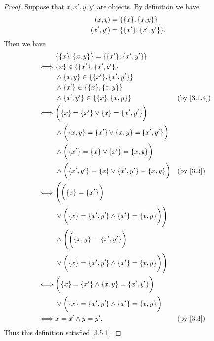 \begin{proof}
	Suppose that \(x, x', y, y'\) are objects.
	By definition we have
	\begin{align*}
		(x, y)   & = \set{\set{x}, \set{x, y}}     \\
		(x', y') & = \set{\set{x'}, \set{x', y'}}.
	\end{align*}
	Then we have
	\begin{align*}
		     & \set{\set{x}, \set{x, y}} = \set{\set{x'}, \set{x', y'}}                                  \\
		\iff & \set{x} \in \set{\set{x'}, \set{x', y'}}                                                  \\
		     & \land \set{x, y} \in \set{\set{x'}, \set{x', y'}}                                         \\
		     & \land \set{x'} \in \set{\set{x}, \set{x, y}}                                              \\
		     & \land \set{x', y'} \in \set{\set{x}, \set{x, y}}                          &  & \by{3.1.4} \\
		\iff & \bigg(\set{x} = \set{x'} \lor \set{x} = \set{x', y'}\bigg)                                \\
		     & \land \bigg(\set{x, y} = \set{x'} \lor \set{x, y} = \set{x', y'}\bigg)                    \\
		     & \land \bigg(\set{x'} = \set{x} \lor \set{x'} = \set{x, y}\bigg)                           \\
		     & \land \bigg(\set{x', y'} = \set{x} \lor \set{x', y'} = \set{x, y}\bigg)   &  & \by{3.3}   \\
		\iff & \Bigg(\bigg(\set{x} = \set{x'}\bigg)                                                      \\
		     & \lor \bigg(\set{x} = \set{x', y'} \land \set{x'} = \set{x, y}\bigg)\Bigg)                 \\
		     & \land \Bigg(\bigg(\set{x, y} = \set{x', y'}\bigg)                                         \\
		     & \lor \bigg(\set{x} = \set{x', y'} \land \set{x'} = \set{x, y}\bigg)\Bigg)                 \\
		\iff & \bigg(\set{x} = \set{x'} \land \set{x, y} = \set{x', y'}\bigg)                            \\
		     & \lor \bigg(\set{x} = \set{x', y'} \land \set{x'} = \set{x, y}\bigg)                       \\
		\iff & x = x' \land y = y'.                                                      &  & \by{3.3}
	\end{align*}
	Thus this definition satisfied \cref{3.5.1}.


\end{proof}
